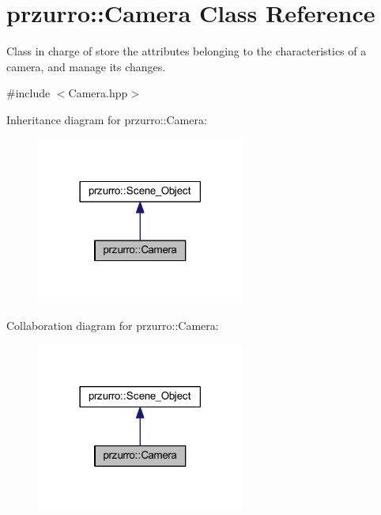 \hypertarget{classprzurro_1_1_camera}{}\section{przurro\+::Camera Class Reference}
\label{classprzurro_1_1_camera}


Class in charge of store the attributes belonging to the characteristics of a camera, and manage it\textquotesingle{}s changes.  




{\ttfamily \#include $<$Camera.\+hpp$>$}



Inheritance diagram for przurro\+::Camera\+:
\nopagebreak
\begin{figure}[H]
\begin{center}
\leavevmode
\includegraphics[width=194pt]{d7/d19/classprzurro_1_1_camera__inherit__graph}
\end{center}
\end{figure}


Collaboration diagram for przurro\+::Camera\+:
\nopagebreak
\begin{figure}[H]
\begin{center}
\leavevmode
\includegraphics[width=194pt]{df/da0/classprzurro_1_1_camera__coll__graph}
\end{center}
\end{figure}
